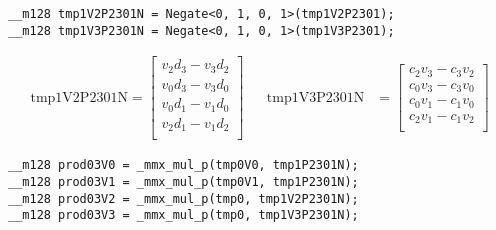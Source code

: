 \documentclass[fontsize = 10pt,DIV = 13]{scrartcl}
\begin{document}
\begin{verbatim}
__m128 tmp1V2P2301N = Negate<0, 1, 0, 1>(tmp1V2P2301);
__m128 tmp1V3P2301N = Negate<0, 1, 0, 1>(tmp1V3P2301);
\end{verbatim}

\begin{align*}
\mathrm{tmp1V2P2301N} 
=
\begin{bmatrix}
v_2d_3 - v_3d_2\\
v_0d_3 - v_3d_0\\
v_0d_1 - v_1d_0\\
v_2d_1 - v_1d_2\\
\end{bmatrix}
&&
\mathrm{tmp1V3P2301N} 
&=
\begin{bmatrix}
c_2v_3 - c_3v_2\\
c_0v_3 - c_3v_0\\
c_0v_1 - c_1v_0\\
c_2v_1 - c_1v_2\\
\end{bmatrix}
\end{align*}

\begin{verbatim}
__m128 prod03V0 = _mmx_mul_p(tmp0V0, tmp1P2301N);
__m128 prod03V1 = _mmx_mul_p(tmp0V1, tmp1P2301N);
__m128 prod03V2 = _mmx_mul_p(tmp0, tmp1V2P2301N);
__m128 prod03V3 = _mmx_mul_p(tmp0, tmp1V3P2301N);
\end{verbatim}
\end{document}
